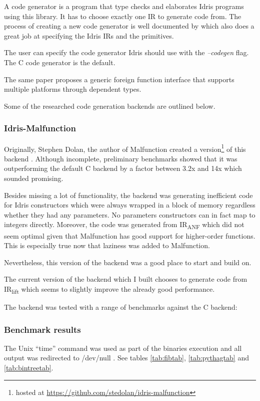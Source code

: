 A code generator is a program that type checks and elaborates
Idris programs using this library.
It has to choose exactly one
IR to generate code from.
The process of creating a new code generator is well
documented by \citep{ElliottIdrisErlang} which also does a great job
at specifying the Idris IRs and the primitives.

The user can specify the code generator Idris should use with
the \emph{--codegen} flag.
The C code generator is the default.

The same paper proposes a generic foreign function interface that
supports multiple platforms through dependent types.

Some of the researched code generation backends are outlined
below.

\subsubsection{Idris-Malfunction}

Originally, Stephen Dolan, the author of Malfunction created a
version\footnote{hosted at
    \url{https://github.com/stedolan/idris-malfunction}}
of this backend \citep{dolan2016malfunctional}.
Although incomplete, preliminary benchmarks showed that it was
outperforming the default C backend by a factor between 3.2x and 14x
which sounded promising.

Besides missing a lot of functionality, the backend was generating
inefficient code for Idris constructors which were always wrapped
in a block of memory regardless whether they had any parameters.
No parameters constructors can in fact map to integers directly.
Moreover, the code was generated from IR\textsubscript{ANF}
which did not seem optimal given that Malfunction has
good support for higher-order functions.
This is especially true now that laziness was added to Malfunction.

Nevertheless, this version of the backend was a good place to start
and build on.

The current version of the backend which I built chooses
to generate code from IR\textsubscript{lift} which seems to
slightly improve the already good performance.

The backend was tested with a range of benchmarks against the
C backend:

\subsubsection{Benchmark results}
The Unix ``time'' command was used as part of the binaries execution
and all output was redirected to /dev/null \citep{self}.
See tables \hyperref[tab:fibtab]{\ref{tab:fibtab}},
\hyperref[tab:pythagtab]{\ref{tab:pythagtab}} and
\hyperref[tab:bintreetab]{\ref{tab:bintreetab}}.

